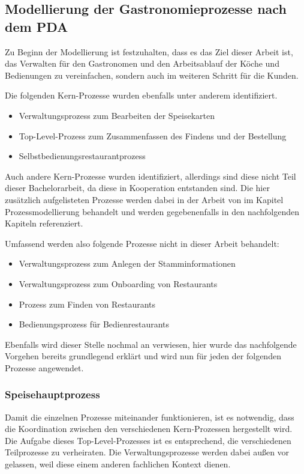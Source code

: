 \subsection{Modellierung der Gastronomieprozesse nach dem \acl{PDA}}
\label{sec:modellierung}
Zu Beginn der Modellierung ist festzuhalten, dass es das Ziel dieser Arbeit ist, das Verwalten für den Gastronomen und den Arbeitsablauf der Köche und Bedienungen zu vereinfachen, sondern auch im weiteren Schritt für die Kunden.

Die folgenden Kern-Prozesse wurden ebenfalls unter anderem identifiziert. 

\begin{itemize}
    \item Verwaltungsprozess zum Bearbeiten der Speisekarten
    \item Top-Level-Prozess zum Zusammenfassen des Findens und der Bestellung 
    \item Selbstbedienungsrestaurantprozess
\end{itemize}

Auch andere Kern-Prozesse wurden identifiziert, allerdings sind diese nicht Teil dieser Bachelorarbeit, da diese in Kooperation entstanden sind. Die hier zusätzlich aufgelisteten Prozesse werden dabei in der Arbeit von \cite{ott_konzeption_2025} im Kapitel Prozessmodellierung behandelt und werden gegebenenfalls in den nachfolgenden Kapiteln referenziert. 

Umfassend werden also folgende Prozesse nicht in dieser Arbeit behandelt: 
\begin{itemize}
    \item Verwaltungsprozess zum Anlegen der Stamminformationen
    \item Verwaltungsprozess zum Onboarding von Restaurants
    \item Prozess zum Finden von Restaurants
    \item Bedienungsprozess für Bedienrestaurants
\end{itemize}

Ebenfalls wird dieser Stelle nochmal an  verwiesen, hier wurde das nachfolgende Vorgehen bereits grundlegend erklärt und wird nun für jeden der folgenden Prozesse angewendet.

\subsubsection{Speisehauptprozess}
Damit die einzelnen Prozesse miteinander funktionieren, ist es notwendig, dass die Koordination zwischen den verschiedenen Kern-Prozessen hergestellt wird. Die Aufgabe dieses Top-Level-Prozesses ist es entsprechend, die verschiedenen Teilprozesse zu verheiraten. Die Verwaltungsprozesse werden dabei außen vor gelassen, weil diese einem anderen fachlichen Kontext dienen. 

